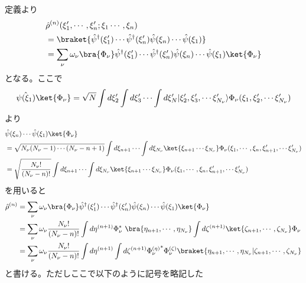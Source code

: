 \documentclass[dvipdfmx, 11pt, a4paper]{jsarticle}
\numberwithin{equation}{section}
\theoremstyle{definition}
\begin{document}
    \begin{derivationBox}
        定義より
        \begin{align}
            &\hat{\rho}^{(n)}(\xi_1',\cdots ,\xi_n';\xi_1\cdots ,\xi_n) \notag \\            &=\braket{\hat{\psi}^\dagger(\xi_1')\cdots\hat{\psi}^\dagger(\xi_n')\hat{\psi}(\xi_n)\cdots \hat{\psi}(\xi_1)} \notag \\
            &=  \sum_\nu \omega_\nu \bra{\Phi_\nu} \hat{\psi}^\dagger(\xi_1')\cdots\hat{\psi}^\dagger(\xi_n')\hat{\psi}(\xi_n)\cdots \hat{\psi}(\xi_1) \ket{\Phi_\nu}
        \end{align}
        となる。ここで
        \begin{align}
            \hat{\psi(\xi_1)} \ket{\Phi_\nu} = \sqrt{N} \int d\xi_2' \int d\xi_3' \cdots \int d\xi_N' |\xi_2',\xi_3',\cdots\xi_{N_\nu}' \rangle \Phi_\nu  (\xi_1,\xi_2',\cdots \xi_{N_\nu}') 
        \end{align}
        より
        \begin{align}
            &\hat{\psi}(\xi_n)\cdots \hat{\psi}(\xi_1)\ket{\Phi_\nu} \notag \\
            &= \sqrt{N_\nu (N_\nu - 1) \cdots(N_\nu - n + 1)} \int d\xi_{n+1} \cdots \int d\xi_{N_\nu}  \ket{\xi_{n+1}\cdots\xi_{N_\nu}} \Phi_\nu(\xi_1, \cdots,\xi_n,\xi_{n+1}',\cdots  \xi_{N_\nu}') \notag \\
            &= \sqrt{\frac{N_\nu !}{(N_\nu - n)!}} \int d\xi_{n+1} \cdots \int d\xi_{N_\nu}  \ket{\xi_{n+1}\cdots\xi_{N_\nu}} \Phi_\nu(\xi_1, \cdots,\xi_n,\xi_{n+1}',\cdots  \xi_{N_\nu}')
        \end{align}
        を用いると
        \begin{align}
            \hat{\rho}^{(n)} &=\sum_\nu \omega_\nu \bra{\Phi_\nu} \hat{\psi}^\dagger(\xi_1')\cdots\hat{\psi}^\dagger(\xi_n')\hat{\psi}(\xi_n)\cdots \hat{\psi}(\xi_1) \ket{\Phi_\nu} \notag \\
            &= \sum_\nu \omega_\nu \frac{N_\nu !}{(N_\nu - n)!} \int d\eta^{(n+1)} \Phi_\nu^*\ \bra{\eta_{n+1},\cdots,\eta_{N_\nu}} \int d\zeta^{(n+1)} \ket{\zeta_{n+1},\cdots,\zeta_{N_\nu}} \Phi_\nu \notag \\
            &= \sum_\nu \omega_\nu \frac{N_\nu !}{(N_\nu - n)!} \int d\eta^{(n+1)}\int d\zeta^{(n+1)}  {\Phi_\nu^{(\eta)}}^* {\Phi_\nu^{(\zeta)}} \braket{\eta_{n+1},\cdots,\eta_{N_\nu}|\zeta_{n+1},\cdots,\zeta_{N_\nu}} 
        \end{align}
        と書ける。ただしここで以下のように記号を略記した
        \begin{align}

\end{align}
\end{derivationBox}
\end{document}

